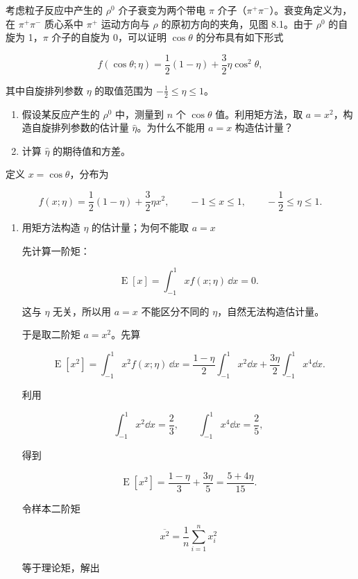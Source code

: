 \begin{question}
考虑粒子反应中产生的 \(\rho^0\) 介子衰变为两个带电 \(\pi\)
介子（\(\pi^+\pi^-\)）。衰变角定义为，在 \(\pi^+\pi^-\) 质心系中
\(\pi^+\) 运动方向与 \(\rho\) 的原初方向的夹角，见图 8.1。由于
\(\rho^0\) 的自旋为 1，\(\pi\) 介子的自旋为 0，可以证明 \(\cos\theta\)
的分布具有如下形式


\[
f(\cos\theta;\eta)=\frac12(1-\eta)+\frac32\eta\cos^2\theta,
\]

其中自旋排列参数 \(\eta\) 的取值范围为 \(-\frac12\le\eta\le1\)。

\begin{enumerate}
\item
  假设某反应产生的 \(\rho^0\) 中，测量到 \(n\) 个 \(\cos\theta\)
  值。利用矩方法，取 \(a=x^2\)，构造自旋排列参数的估计量
  \(\hat\eta\)。为什么不能用 \(a=x\) 构造估计量？
\item
  计算 \(\hat\eta\) 的期待值和方差。
\end{enumerate}
\begin{solution}
定义 \(x=\cos\theta\)，分布为

\[
f(x;\eta)=\frac12(1-\eta)+\frac32\eta x^2,
\qquad -1\le x\le 1,
\qquad -\frac12\le\eta\le 1.
\]

\begin{enumerate}
\item 用矩方法构造 \(\eta\) 的估计量；为何不能取 \(a=x\)

先计算一阶矩：

\[
\operatorname{E}[x]=\int_{-1}^1 x f(x;\eta)\,\dd{x} = 0.
\]

这与 \(\eta\) 无关，所以用 \(a=x\) 不能区分不同的
\(\eta\)，自然无法构造估计量。

于是取二阶矩 \(a=x^2\)。先算

\[
\operatorname{E}[x^2]=\int_{-1}^1 x^2 f(x;\eta)\,\dd{x}
=\frac{1-\eta}{2}\int_{-1}^1 x^2\dd{x} + \frac{3\eta}{2}\int_{-1}^1 x^4\dd{x}.
\]

利用

\[
\int_{-1}^1 x^2\dd{x}=\frac23,
\qquad
\int_{-1}^1 x^4\dd{x}=\frac25,
\]

得到

\[
\operatorname{E}[x^2]=\frac{1-\eta}{3}+\frac{3\eta}{5}=\frac{5+4\eta}{15}.
\]

令样本二阶矩

\[
\overline{x^2}=\frac1n\sum_{i=1}^n x_i^2
\]

等于理论矩，解出


\end{enumerate}
\end{solution}
\end{question}

